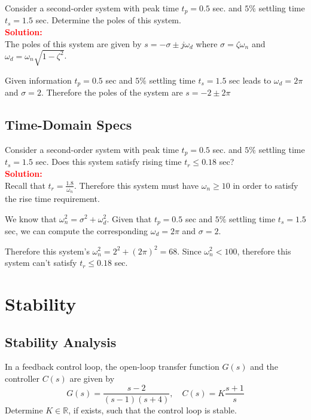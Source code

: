 \documentclass[12pt]{article}
\begin{document}
Consider a second-order system with peak time $t_p = 0.5$ sec. and $5\%$ settling time $t_s = 1.5$ sec. Determine the poles of this system. \\
\textbf{\textcolor{red}{Solution:}} \\
The poles of this system are given by $s= -\sigma \pm j \omega_d$ where $\sigma=\zeta \omega_n$ and $\omega_d=\omega_n \sqrt{1-\zeta^2}$.

Given information $t_p = 0.5$ sec and $5\%$ settling time $t_s = 1.5$ sec leads to $\omega_d=2 \pi$ and $\sigma=2$. Therefore the poles of the system are $s=-2 \pm 2 \pi $

\clearpage
\subsection{Time-Domain Specs}

Consider a second-order system with peak time $t_p = 0.5$ sec. and $5\%$ settling time $t_s = 1.5$ sec. Does this system satisfy rising time $t_r \leq 0.18$ sec? \\
\textbf{\textcolor{red}{Solution:}} \\
Recall that $t_r=\frac{1.8}{\omega_n}$. Therefore this system must have $\omega_n \geq 10$ in order to satisfy the rise time requirement. 

We know that $\omega_n^2 =\sigma^2 +\omega_d^2$. Given that $t_p = 0.5$ sec and $5\%$ settling time $t_s = 1.5$ sec, we can compute the corresponding $\omega_d=2 \pi$ and $\sigma=2$. 

Therefore this system's $\omega_n^2 = 2^2 + (2 \pi)^2 =68$. Since $\omega_n^2 < 100$, therefore this system can't satisfy $t_r \leq 0.18$ sec.  

\clearpage
\section{Stability}
\subsection{Stability Analysis}
In a feedback control loop, the open-loop transfer function \(G(s)\) and the controller \(C(s)\) are given by
\begin{equation}
G(s) = \frac{s - 2}{(s - 1)(s + 4)}, \quad C(s) = K \frac{s + 1}{s}
\end{equation}
Determine \(K \in \mathbb{R}\), if exists, such that the control loop is stable.
\end{document}
